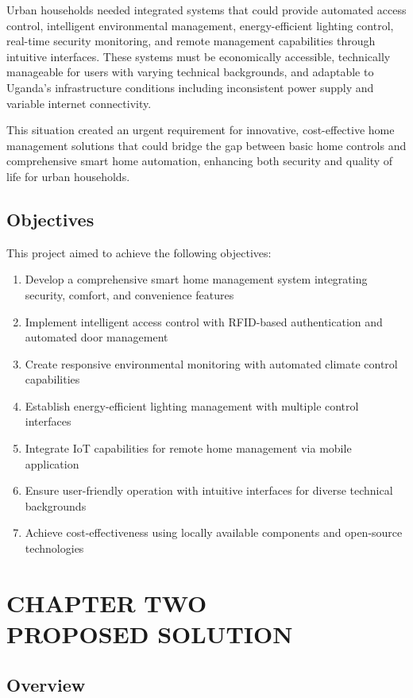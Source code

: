 \documentclass[12pt,a4paper]{report}
\begin{document}
\noindent Urban households needed integrated systems that could provide automated access control, intelligent environmental management, energy-efficient lighting control, real-time security monitoring, and remote management capabilities through intuitive interfaces. These systems must be economically accessible, technically manageable for users with varying technical backgrounds, and adaptable to Uganda's infrastructure conditions including inconsistent power supply and variable internet connectivity.

\noindent This situation created an urgent requirement for innovative, cost-effective home management solutions that could bridge the gap between basic home controls and comprehensive smart home automation, enhancing both security and quality of life for urban households.
\newpage
\section{Objectives}

\noindent This project aimed to achieve the following objectives:

\begin{enumerate}
\item Develop a comprehensive smart home management system integrating security, comfort, and convenience features
\item Implement intelligent access control with RFID-based authentication and automated door management
\item Create responsive environmental monitoring with automated climate control capabilities
\item Establish energy-efficient lighting management with multiple control interfaces
\item Integrate IoT capabilities for remote home management via mobile application
\item Ensure user-friendly operation with intuitive interfaces for diverse technical backgrounds
\item Achieve cost-effectiveness using locally available components and open-source technologies
\end{enumerate}

\chapter[CHAPTER TWO PROPOSED SOLUTION]{CHAPTER TWO\\PROPOSED SOLUTION}

\section{Overview}
\end{document}
